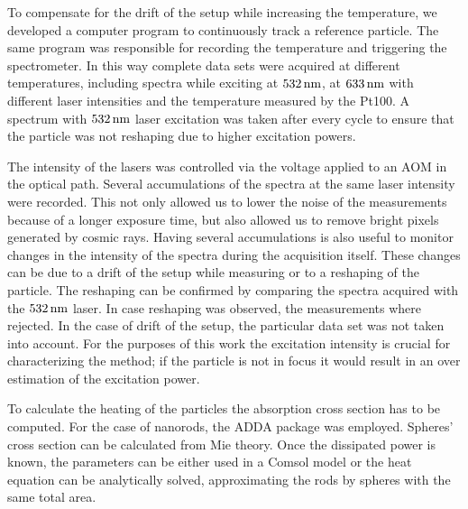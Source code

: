To compensate for the drift of the setup while increasing the temperature, we
developed a computer program to continuously track a reference particle. The
same program was responsible for recording the temperature and triggering the
spectrometer. In this way complete data sets were acquired at different
temperatures, including spectra while exciting at $532\,\textrm{nm}$, at $633\,\textrm{nm}$ with
different laser intensities and the temperature measured by the Pt100. A
spectrum with $532\,\textrm{nm}$ laser excitation was taken after every cycle to ensure
that the particle was not reshaping due to higher excitation powers.

The intensity of the lasers was controlled via the voltage applied to an AOM in
the optical path. Several accumulations of the spectra at the same laser
intensity were recorded. This not only allowed us to lower the noise of the
measurements because of a longer exposure time, but also allowed us to remove
bright pixels generated by cosmic rays. Having several accumulations is also
useful to monitor changes in the intensity of the spectra during the acquisition
itself. These changes can be due to a drift of the setup while measuring or to a
reshaping of the particle. The reshaping can be confirmed by comparing the
spectra acquired with the $532\,\textrm{nm}$ laser\cite{Liu2009}. In case reshaping was
observed, the measurements where rejected. In the case of drift of the
setup, the particular data set was not taken into account. For the purposes of this
work the excitation intensity is crucial for characterizing the method;
if the particle is not in focus it would result in an over estimation of the
excitation power. 

To calculate the heating of the particles the absorption cross section has to be
computed. For the case of nanorods, the ADDA package was
employed\cite{Yurkin2011}. Spheres' cross section can be calculated from Mie
theory. Once the dissipated power is known, the parameters can be either used in
a Comsol model or the heat equation can be analytically solved, approximating
the rods by spheres with the same total area.


